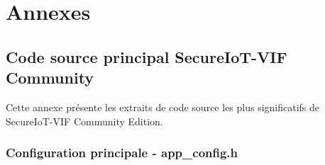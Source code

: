 
\chapter{Annexes}
\label{chap:appendices}

\section{Code source principal SecureIoT-VIF Community}
\label{app:source-code}

Cette annexe présente les extraits de code source les plus significatifs de SecureIoT-VIF Community Edition.

\subsection{Configuration principale - app\_config.h}

